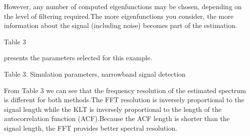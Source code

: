 \documentclass[12pt]{report}
\begin{document}
However, any number of computed eigenfunctions may be chosen, depending on the level of filtering required.\@ The more eigenfunctions you consider, the more information about the signal (including noise) becomes part of the estimation.\@ \begin{normalsize}\color{red}Table 3\end{normalsize} presents the parameters selected for this example.
\begin{center}
	\color{blue}Table 3. Simulation parameters, narrowband signal detection
\end{center}
From Table 3 we can see that the frequency resolution of the estimated spectrum is different for both methods.\@ The FFT resolution is inversely proportional to the signal length while the KLT is inversely proportional to the length of the autocorrelation function (ACF).\@ Because the ACF length is shorter than the signal length, the FFT provides better spectral resolution.
\end{document}
